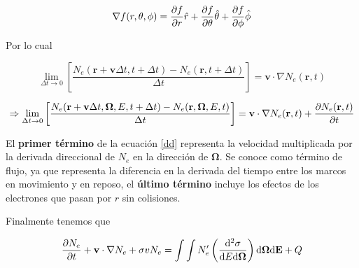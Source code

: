 \documentclass[aspectratio=169,xcolor=dvipsnames,t]{beamer}
\newcommand{\be}{\begin{equation*}}
\newcommand{\ee}{\end{equation*}}
\newcommand{\bae}{\begin{eqnarray}}
\newcommand{\eae}{\end{eqnarray}}
\newcommand{\pl}{\left(}
\newcommand{\pr}{\right)}
\newcommand{\kl}{\left[}
\newcommand{\kr}{\right]}
\begin{document}
\begin{frame}

    \vspace{1.4cm}

    \begin{center}
        \begin{tcolorbox}[colback=gray!25!white,colframe=gray, title=\textbf{Gradiente},width=0.45\linewidth, center title]
            \vspace{-0.5cm}
            \be
                \nabla f(r,\theta,\phi) = \pdv{f}{r} \hat{r} + \pdv{f}{\theta} \hat{\theta} + \pdv{f}{\phi} \hat{\phi}
            \ee
        \end{tcolorbox}
    \end{center}

    Por lo cual

    \be
    \lim_{\Delta t  \rightarrow 0} \kl \frac{N_e(\mathbf{r} + \mathbf{v} \Delta t, t + \Delta t) - N_e(\mathbf{r}, t + \Delta t)}{\Delta t} \kr = \mathbf{v} \cdot \nabla N_e(\mathbf{r}, t)
    \ee
    
\end{frame}

\begin{frame}

    \bae \label{dd}
    \Rightarrow \lim_{\Delta t  \rightarrow 0} \kl \frac{N_e(\mathbf{r} + \mathbf{v} \Delta t, \bm{\Omega}, E, t + \Delta t) - N_e(\mathbf{r},\bm{\Omega}, E, t)}{\Delta t} \kr = \mathbf{v} \cdot \nabla N_e(\mathbf{r}, t) + \pdv{N_e(\mathbf{r}, t)}{t}
    \eae

    El \textbf{primer término} de la ecuación \eqref{dd} representa la velocidad multiplicada por la derivada direccional de $N_e$ en la dirección de $\bm{\Omega}$. Se conoce como término de flujo, ya que representa la diferencia en la derivada del tiempo entre los marcos en movimiento y en reposo, el \textbf{último término} incluye los efectos de los electrones que pasan por $r$ sin colisiones.

    Finalmente tenemos que

    \bae
    \pdv{N_e}{t} + \mathbf{v} \cdot \nabla N_e + \sigma v N_e = \int \int N_e' \pl \frac{\dd[2]{\sigma}}{\dd E \dd \bm{\Omega}} \pr \text{d}\bm{\Omega} \text{d}\mathbf{E} + Q
    \eae
    
\end{frame}
\end{document}
